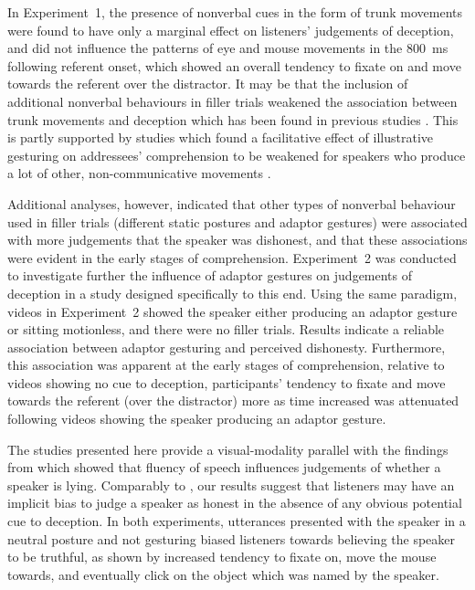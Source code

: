 \documentclass[a4paper,man,natbib]{apa6}
\begin{document}
In Experiment~1, the presence of nonverbal cues in the form of trunk movements were found to have only a marginal effect on listeners' judgements of deception, and did not influence the patterns of eye  and mouse movements in the 800~ms following referent onset, which showed an overall tendency to fixate on and move towards the referent over the distractor.
It may be that the inclusion of additional nonverbal behaviours in filler trials weakened the association between trunk movements and deception which has been found in previous studies \citep[e.g][]{Vrij1996a}.
This is partly supported by studies which found a facilitative effect of illustrative gesturing on addressees' comprehension to be weakened for speakers who produce a lot of other, non-communicative movements \citep{Holle2007}.

Additional analyses, however, indicated that other types of nonverbal behaviour used in filler trials (different static postures and adaptor gestures) were associated with more judgements that the speaker was dishonest, and that these associations were evident in the early stages of comprehension.
Experiment~2 was conducted to investigate further the influence of adaptor gestures on judgements of deception in a study designed specifically to this end.
Using the same paradigm, videos in Experiment~2 showed the speaker either producing an adaptor gesture or sitting motionless, and there were no filler trials. 
Results indicate a reliable association between adaptor gesturing and perceived dishonesty.
Furthermore, this association was apparent at the early stages of comprehension, relative to videos showing no cue to deception, participants' tendency to fixate and move towards the referent (over the distractor) more as time increased was attenuated following videos showing the speaker producing an adaptor gesture.

The studies presented here provide a visual-modality parallel with the findings from \citet{Loy2017} which showed that fluency of speech influences judgements of whether a speaker is lying.
Comparably to \citet{Loy2017}, our results suggest that listeners may have an implicit bias to judge a speaker as honest in the absence of any obvious potential cue to deception.
In both experiments, utterances presented with the speaker in a neutral posture and not gesturing biased listeners towards believing the speaker to be truthful, as shown by increased tendency to fixate on, move the mouse towards, and eventually click on the object which was named by the speaker. 
\end{document}
